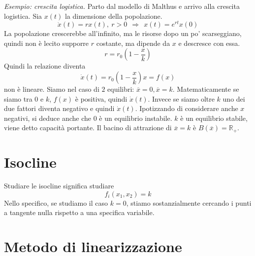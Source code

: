 \documentclass[10pt,a4paper]{book}
\begin{document}
\textit{Esempio: crescita logistica. }Parto dal modello di Malthus e arrivo alla crescita logistica. Sia $x( t)$ la dimensione della popolazione.
\begin{equation*}
\dot{x}( t) =rx( t) ,\ r >0\ \ \Rightarrow \ \ x( t) =e^{rt} x( 0)
\end{equation*}
La popolazione crescerebbe all'infinito, ma le risorse dopo un po' scarseggiano, quindi non è lecito supporre $r$ costante, ma dipende da $x$ e descresce con essa.
\begin{equation*}
r=r_{0}\left( 1-\frac{x}{k}\right)
\end{equation*}
Quindi la relazione diventa
\begin{equation*}
\dot{x}( t) =r_{0}\left( 1-\frac{x}{k}\right) x=f( x)
\end{equation*}
non è lineare. Siamo nel caso di $2$ equilibri: $\overline{x} =0,\overline{x} =k$. Matematicamente se siamo tra $0$ e $k$, $f( x)$ è positiva, quindi $\dot{x}( t)$. Invece se siamo oltre $k$ uno dei due fattori diventa negativo e quindi $\dot{x}( t)$. Ipotizzando di considerare anche $x$ negativi, si deduce anche che $0$ è un equilibrio instabile. $k$ è un equilibrio stabile, viene detto capacità portante. Il bacino di attrazione di $\overline{x} =k$ è $B(\overline{x}) =\mathbb{R}_{+}$.
\section{Isocline}

Studiare le isocline significa studiare
\begin{equation*}
f_{i}( x_{1} ,x_{2}) =k
\end{equation*}
Nello specifico, se studiamo il caso $k=0$, stiamo sostanzialmente cercando i punti a tangente nulla rispetto a una specifica variabile.
\section{Metodo di linearizzazione}
\end{document}
